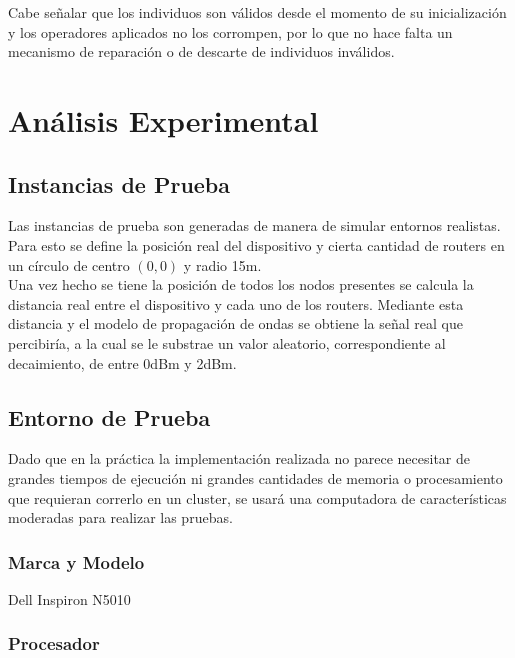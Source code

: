 \documentclass[journal]{IEEEtran}
\begin{document}
Cabe señalar que los individuos son válidos desde el momento de su inicialización y los operadores aplicados no los corrompen, por lo que no hace falta un mecanismo de reparación o de descarte de individuos inválidos.

\section{Análisis Experimental}

\subsection{Instancias de Prueba}

Las instancias de prueba son generadas de manera de simular entornos realistas.\\

Para esto se define la posición real del dispositivo y cierta cantidad de routers en un círculo de centro $(0,0)$ y radio 15m.\\

Una vez hecho se tiene la posición de todos los nodos presentes se calcula la distancia real entre el dispositivo y cada uno de los routers. Mediante esta distancia y el modelo de propagación de ondas se obtiene la señal real que percibiría, a la cual se le substrae un valor aleatorio, correspondiente al decaimiento, de entre 0dBm y 2dBm.\\

\subsection{Entorno de Prueba}

Dado que en la práctica la implementación realizada no parece necesitar de grandes tiempos de ejecución ni grandes cantidades de memoria o procesamiento que requieran correrlo en un cluster, se usará una computadora de características moderadas para realizar las pruebas.\\

\subsubsection{Marca y Modelo}

Dell Inspiron N5010\\

\subsubsection{Procesador}
\end{document}
